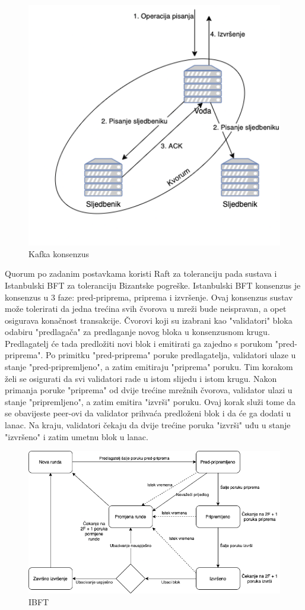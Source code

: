 \documentclass[times, utf8, diplomski]{fer}
\begin{document}
\begin{figure}[htb]
\centering
\includegraphics[width=12cm]{imgs/Kafka.png}
\caption{Kafka konsenzus}
\label{fig:kafka}
\end{figure}

Quorum po zadanim postavkama koristi Raft za toleranciju pada sustava i Istanbulski BFT za toleranciju Bizantske pogreške. Istanbulski BFT konsenzus je konsenzus u 3 faze: pred-priprema, priprema i izvršenje. Ovaj konsenzus sustav može tolerirati da jedna trećina svih čvorova u mreži bude neispravan, a opet osigurava konačnost transakcije. Čvorovi koji su izabrani kao "validatori" bloka odabiru "predlagača" za predlaganje novog bloka u konsenzusnom krugu. Predlagatelj će tada predložiti novi blok i emitirati ga zajedno s porukom "pred-priprema". Po primitku "pred-priprema" poruke predlagatelja, validatori ulaze u stanje "pred-pripremljeno", a zatim emitiraju "priprema" poruku. Tim korakom želi se osigurati da svi validatori rade u istom slijedu i istom krugu. Nakon primanja poruke "priprema" od dvije trećine mrežnih čvorova, validator ulazi u stanje "pripremljeno", a zatim emitira "izvrši" poruku. Ovaj korak služi tome da se obavijeste peer-ovi da validator prihvaća predloženi blok i da će ga dodati u lanac. Na kraju, validatori čekaju da dvije trećine poruka "izvrši" uđu u stanje "izvršeno" i zatim umetnu blok u lanac. \cite{IBFT}

\begin{figure}[htb]
\centering
\includegraphics[width=12cm]{imgs/IBFT.png}
\caption{IBFT}
\label{fig:ibft}
\end{figure}
\end{document}
